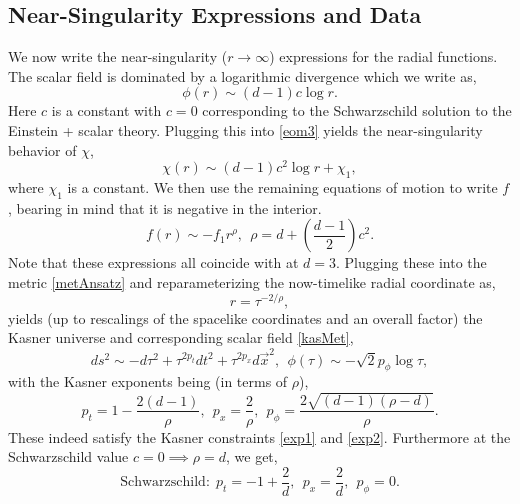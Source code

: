 \documentclass[12pt,a4paper]{article}
\begin{document}
\subsection{Near-Singularity Expressions and Data}\label{sec2.2}

We now write the near-singularity ($r \to \infty$) expressions for the radial functions. The scalar field is dominated by a logarithmic divergence \cite{Doroshkevich:1978aq,Fournodavlos:2018lrk} which we write as,
\begin{equation}
\phi(r) \sim (d-1) c\log r.\label{singField}
\end{equation}
Here $c$ is a constant with $c = 0$ corresponding to the Schwarzschild solution to the Einstein + scalar theory. Plugging this into \eqref{eom3} yields the near-singularity behavior of $\chi$,
\begin{equation}
\chi(r) \sim (d-1)c^2 \log r + \chi_1,
\end{equation}
where $\chi_1$ is a constant. We then use the remaining equations of motion to write $f$, bearing in mind that it is negative in the interior.
\begin{equation}
f(r) \sim -f_1 r^\rho,\ \ \rho = d + \left(\frac{d-1}{2}\right)c^2.
\end{equation}
Note that these expressions all coincide with \cite{Frenkel:2020ysx} at $d = 3$. Plugging these into the metric \eqref{metAnsatz} and reparameterizing the now-timelike radial coordinate as,
\begin{equation}
r = \tau^{-2/\rho},
\end{equation}
yields (up to rescalings of the spacelike coordinates and an overall factor) the Kasner universe and corresponding scalar field \eqref{kasMet},
\begin{equation}
ds^2 \sim -d\tau^2 + \tau^{2p_t} dt^2 + \tau^{2p_x} d\vec{x}^2,\ \ \phi(\tau) \sim -\sqrt{2} p_\phi\log\tau,
\end{equation}
with the Kasner exponents being (in terms of $\rho$),
\begin{equation}
p_t = 1 - \frac{2(d-1)}{\rho},\ \ p_x = \frac{2}{\rho},\ \ p_\phi = \frac{2\sqrt{(d-1)(\rho-d)}}{\rho}.
\end{equation}
These indeed satisfy the Kasner constraints \eqref{exp1} and \eqref{exp2}. Furthermore at the Schwarzschild value $c = 0 \implies \rho = d$, we get,
\begin{equation}
\text{Schwarzschild:}\ \ p_t = -1 + \frac{2}{d},\ \ p_x = \frac{2}{d},\ \ p_\phi = 0.
\end{equation}
\end{document}
